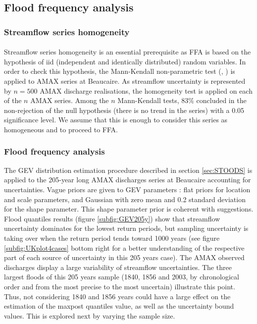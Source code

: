 \documentclass[11pt]{article}
\begin{document}
   
    \subsection{Flood frequency analysis}
    
        \subsubsection{Streamflow series homogeneity}
           
        \paragraph{}
        Streamflow series homogeneity is an essential prerequisite as FFA is based on the hypothesis of iid (independent and identically distributed) random variables. In order to check this hypothesis, the Mann-Kendall non-parametric test (\citet{mann_nonparametric_1945}, \citet{kendall_rank_1948}) is applied to AMAX series at Beaucaire. As streamflow uncertainty is represented by $n = 500$ AMAX discharge realisations, the homogeneity test is applied on each of the $n$ AMAX series. Among the $n$ Mann-Kendall tests, 83\% concluded in the non-rejection of the null hypothesis (there is no trend in the series) with a 0.05 significance level. We assume that this is enough to consider this series as homogeneous and to proceed to FFA. 
        
        \subsubsection{Flood frequency analysis}
        
       The GEV distribution estimation procedure described in section \ref{sec:STOODS} is applied to the 205-year long AMAX discharges series at Beaucaire accounting for uncertainties. Vague priors are given to GEV parameters : flat priors for location and scale parameters, and Gaussian with zero mean and 0.2 standard deviation for the shape parameter. This shape parameter prior is coherent with \citet{martins_generalized_2000} suggestions.
       Flood quantiles results (figure \ref{subfig:GEV205y}) show that streamflow uncertainty dominates for the lowest return periods, but sampling uncertainty is taking over when the return period tends toward 1000 years (see figure \ref{subfig:UKplot4cases} bottom right  for a better understanding of the respective part of each source of uncertainty in this 205 years case). The AMAX observed discharges display a large variability of streamflow uncertainties. The three largest floods of this 205 years sample (1840, 1856 and 2003, by chronological order and from the most precise to the most uncertain) illustrate this point. Thus, not considering 1840 and 1856 years could have a large effect on the estimation of the maxpost quantiles value, as well as the uncertainty bound values. This is explored next by varying the sample size.
       
\end{document}
